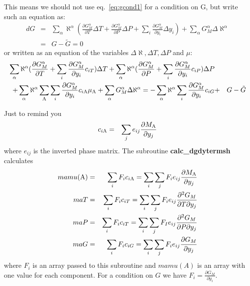 \documentclass[12pt]{article}
\begin{document}
This means we should not use eq.~\ref{eq:gcond1} for a condition on G,
but write such an equation as:
\begin{eqnarray}
dG &=& \sum_{\alpha} \aleph^{\alpha} (\frac{\partial G^{\alpha}_M}{\partial T} \Delta T + 
\frac{\partial G^{\alpha}_M}{\partial P} \Delta P + 
\sum_i\frac{\partial G^{\alpha}_M}{\partial y_{i}} \Delta y_i) +
\sum_{\alpha} G^{\alpha}_M \Delta\aleph^{\alpha}\nonumber\\&=& G - \tilde G = 0\label{eq:gcond2}
\end{eqnarray}
or written as an equation of the variables $\Delta \aleph, \Delta T,
\Delta P$ and $\mu$:
\begin{eqnarray}
\sum_{\alpha} \aleph^{\alpha} 
(\frac{\partial G^{\alpha}_M}{\partial T}+
\sum_i\frac{\partial G^{\alpha}_M}{\partial y_{i}} c_{iT})\Delta T
+\sum_{\alpha} \aleph^{\alpha} 
(\frac{\partial G^{\alpha}_M}{\partial P}+
\sum_i\frac{\partial G^{\alpha}_M}{\partial y_{i}} c_{iP})\Delta P \nonumber\\
+\sum_{\alpha} \aleph^{\alpha}
\sum_{\rm A}\sum_i\frac{\partial G^{\alpha}_M}{\partial y_{i}} c_{i\rm A}\mu_{\rm A}
+\sum_{\alpha} G^{\alpha}_M \Delta\aleph^{\alpha}
= -\sum_{\alpha} \aleph^{\alpha}
\sum_i\frac{\partial G^{\alpha}_M}{\partial y_{i}} c_{iG}
&+&G - \tilde G\nonumber\\\label{eq:scond2}
\end{eqnarray}

Just to remind you
\begin{eqnarray}
c_{i\rm A} &=& \sum_j e_{ij}\frac{\partial M_{\rm A}}{\partial y_j}
\end{eqnarray}
where $e_{ij}$ is the inverted phase matrix.  The subroutine {\bf
  calc\_dgdytermsh} calculates
\begin{eqnarray}
mamu({\rm A}) &=& \sum_i F_i c_{i\rm A} = \sum_i\sum_j F_i e_{ij}\frac{\partial M_{\rm A}}{\partial y_j}\\
maT &=& \sum_i F_i c_{iT} = \sum_i\sum_j F_i e_{ij}\frac{\partial^2 G_M}{\partial T\partial y_j}\\
maP &=& \sum_i F_i c_{iT} = \sum_i\sum_j F_I e_{ij}\frac{\partial^2 G_M}{\partial P\partial y_j}\\
maG &=& \sum_i F_i c_{iG} = \sum_i\sum_j F_i e_{ij}\frac{\partial G_M}{\partial y_j}
\end{eqnarray}
where $F_i$ is an array passed to this subroutine and $mamu(A)$ is an
array with one value for each component.  For a condition on $G$ we
have $F_i = \frac{\partial G_M}{\partial y_i}$.
\end{document}
